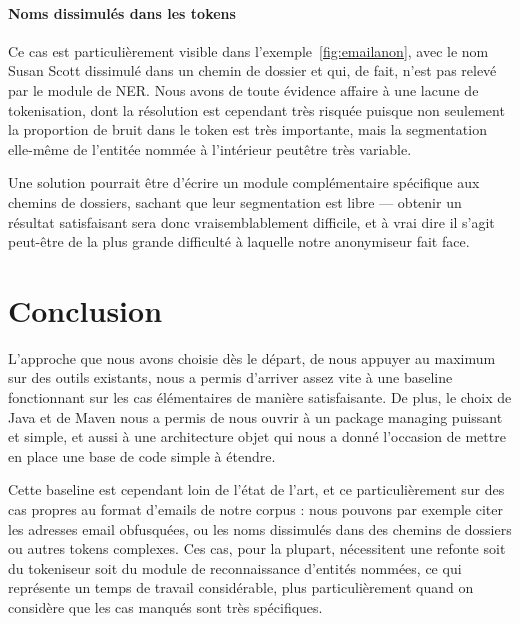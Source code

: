 \documentclass[11pt]{article}
\begin{document}
\paragraph{Noms dissimulés dans les tokens}

Ce cas est particulièrement visible dans l'exemple~\ref{fig:emailanon}, avec le
nom Susan Scott dissimulé dans un chemin de dossier et qui, de fait, n'est pas
relevé par le module de NER. Nous avons de toute évidence affaire à une lacune
de tokenisation, dont la résolution est cependant très risquée puisque non
seulement la proportion de bruit dans le token est très importante, mais la
segmentation elle-même de l'entitée nommée à l'intérieur peutêtre très
variable.

Une solution pourrait être d'écrire un module complémentaire spécifique
aux chemins de dossiers, sachant que leur segmentation est libre --- obtenir un
résultat satisfaisant sera donc vraisemblablement difficile, et à vrai dire il
s'agit peut-être de la plus grande difficulté à laquelle notre anonymiseur fait
face.

\newpage

\section*{Conclusion}

L'approche que nous avons choisie dès le départ, de nous appuyer au maximum sur
des outils existants, nous a permis d'arriver assez vite à une baseline
fonctionnant sur les cas élémentaires de manière satisfaisante. De plus, le
choix de Java et de Maven nous a permis de nous ouvrir à un package managing
puissant et simple, et aussi à une architecture objet qui nous a donné
l'occasion de mettre en place une base de code simple à étendre.

Cette baseline est cependant loin de l'état de l'art, et ce particulièrement
sur des cas propres au format d'emails de notre corpus : nous pouvons par
exemple citer les adresses email obfusquées, ou les noms dissimulés dans des
chemins de dossiers ou autres tokens complexes. Ces cas, pour la plupart,
nécessitent une refonte soit du tokeniseur soit du module de reconnaissance
d'entités nommées, ce qui représente un temps de travail considérable, plus
particulièrement quand on considère que les cas manqués sont très spécifiques.

\newpage
\tableofcontents
\end{document}

